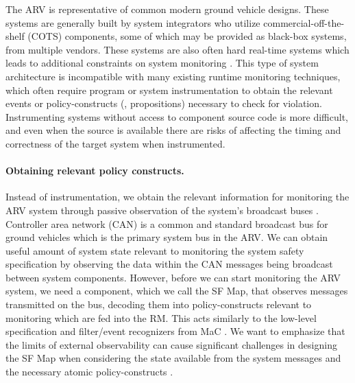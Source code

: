 The ARV is representative of common modern ground vehicle designs. These systems are generally built by system integrators who utilize commercial-off-the-shelf (COTS) components, some of which may be provided as black-box systems, from multiple vendors.
These systems are also often hard real-time systems which leads to additional constraints on system monitoring \cite{Goodloe2010}. 
This type of system architecture is incompatible with many existing runtime monitoring techniques, which often require program or system instrumentation \cite{Havelund2004, Chen2003, Bonakdarpour2012,Kim2004} to obtain the relevant events or policy-constructs (\eg, propositions) necessary to check for violation. 
Instrumenting systems without access to component source code is more difficult, and even when the source is available there are risks of affecting the timing and correctness of the target system when instrumented.

\paragraph{Obtaining relevant policy constructs.}
Instead of instrumentation, we obtain the relevant information for monitoring the ARV system through passive observation of the system's broadcast buses \cite{Rushby2001}. 
Controller area network (CAN) is a common and standard broadcast bus for ground vehicles which is the primary system bus in the ARV. We can obtain useful amount of system state relevant to monitoring the system safety specification by observing the data within the CAN messages being broadcast between system components.
However, before we can start monitoring the ARV system, we need a component, which we call the \textsf{SF Map}, that observes messages transmitted on the bus, decoding them into policy-constructs relevant to monitoring which are fed into the RM. 
This acts similarly to the low-level specification and filter/event recognizers from MaC \cite{Kim2004}.
We want to emphasize that the limits of external observability can cause significant challenges  in designing the \textsf{SF Map} when considering the state available from the system messages and the necessary atomic policy-constructs \cite{Kane2014}.

